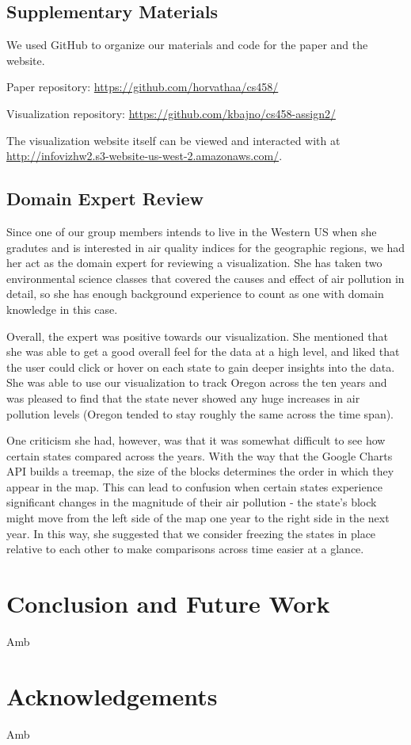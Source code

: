 \documentclass[journal]{vgtc}                %
\begin{document}
\subsection{Supplementary Materials}

We used GitHub to organize our materials and code for the paper and the website. 

Paper repository: \url{https://github.com/horvathaa/cs458/}

Visualization repository: \url{https://github.com/kbajno/cs458-assign2/}

The visualization website itself can be viewed and interacted with at 
\url{http://infovizhw2.s3-website-us-west-2.amazonaws.com/}.


\subsection{Domain Expert Review}

Since one of our group members intends to live in the Western US when she gradutes and 
is interested in air quality indices for the geographic regions, we had her act as the 
domain expert for reviewing a visualization. She has taken two environmental science 
classes that covered the causes and effect of air pollution in detail, so she has
enough background experience to count as one with domain knowledge in this case.

Overall, the expert was positive towards our visualization. She mentioned that she was
able to get a good overall feel for the data at a high level, and liked that the user
could click or hover on each state to gain deeper insights into the data. She was able
to use our visualization to track Oregon across the ten years and was pleased to find
that the state never showed any huge increases in air pollution levels (Oregon tended
to stay roughly the same across the time span). 

One criticism she had, however, was that it was somewhat difficult to see how certain 
states compared across the years. With the way that the Google Charts API builds a 
treemap, the size of the blocks determines the order in which they appear in the map. 
This can lead to confusion when certain states experience significant changes in the 
magnitude of their air pollution - the state's block might move from the left side of
the map one year to the right side in the next year. In this way, she suggested that
we consider freezing the states in place relative to each other to make comparisons
across time easier at a glance.


\section{Conclusion and Future Work}

Amb

\section{Acknowledgements}

Amb
\end{document}

